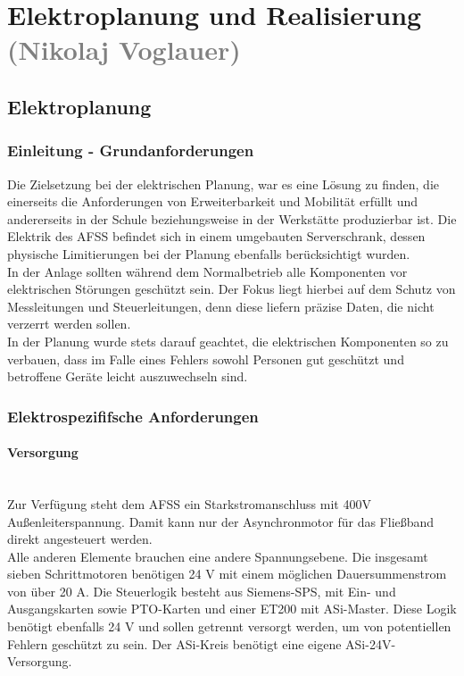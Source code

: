 \section{Elektroplanung und Realisierung \textcolor{gray}{(Nikolaj Voglauer)}}

\subsection{Elektroplanung}
\label{sec:Elektroplanung}

\subsubsection{Einleitung - Grundanforderungen}
    Die Zielsetzung bei der elektrischen Planung, war es eine Lösung zu finden, die einerseits die Anforderungen von Erweiterbarkeit und Mobilität erfüllt und andererseits in der Schule beziehungsweise in der Werkstätte produzierbar ist. Die Elektrik des AFSS befindet sich in einem umgebauten Serverschrank, dessen physische Limitierungen bei der Planung ebenfalls berücksichtigt wurden.\\
    In der Anlage sollten während dem Normalbetrieb alle Komponenten vor elektrischen Störungen geschützt sein. Der Fokus liegt hierbei auf dem Schutz von Messleitungen und Steuerleitungen, denn diese liefern präzise Daten, die nicht verzerrt werden sollen.\\ 
    In der Planung wurde stets darauf geachtet, die elektrischen Komponenten so zu verbauen, dass im Falle eines Fehlers sowohl Personen gut geschützt und betroffene Geräte leicht auszuwechseln sind.\\

\subsubsection{Elektrospezififsche Anforderungen}
\label{sec:Elektrik spezififsche Anforderungen}

    \paragraph{Versorgung}\mbox{}\\
    Zur Verfügung steht dem AFSS ein Starkstromanschluss mit 400V Außenleiterspannung. Damit kann nur der Asynchronmotor für das Fließband direkt angesteuert werden.\\
    Alle anderen Elemente brauchen eine andere Spannungsebene. Die insgesamt sieben Schrittmotoren benötigen 24 V mit einem möglichen Dauersummenstrom von über 20 A. Die Steuerlogik besteht aus Siemens-SPS, mit Ein- und Ausgangskarten sowie PTO-Karten und einer ET200 mit ASi-Master. Diese Logik benötigt ebenfalls 24 V und sollen getrennt versorgt werden, um von potentiellen Fehlern geschützt zu sein. Der ASi-Kreis benötigt eine eigene ASi-24V-Versorgung.

